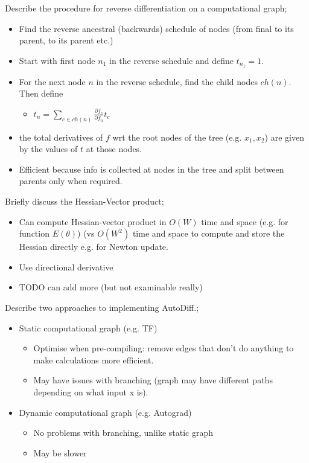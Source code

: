 \documentclass{article}
\begin{document}
Describe the procedure for reverse differentiation on a computational graph; \begin{itemize} \item Find the reverse ancestral (backwards) schedule of nodes (from final to its parent, to its parent etc.) \item Start with first node $n_1$ in the reverse schedule and define $t_{n_1}=1$.  \item For the next node $n$ in the reverse schedule, find the child nodes $ch(n)$. Then define \begin{itemize} \item $t_n = \sum_{c\in ch(n)}\frac{\partial f_c}{\partial f_n}t_c$ \end{itemize} \item the total derivatives of $f$ wrt the root nodes of the tree (e.g. $x_1, x_2$) are given by the values of $t$ at those nodes.  \item Efficient because info is collected at nodes in the tree and split between parents only when required.  \end{itemize}

Briefly discuss the Hessian-Vector product; \begin{itemize} \item Can compute Hessian-vector product in $O(W)$ time and space (e.g. for function $E(\theta)$) (vs $O(W^2)$ time and space to compute and store the Hessian directly e.g. for Newton update.  \item Use directional derivative \item TODO can add more (but not examinable really) \end{itemize}

Describe two approaches to implementing AutoDiff.; \begin{itemize} \item Static computational graph (e.g. TF) \begin{itemize} \item Optimise when pre-compiling: remove edges that don't do anything to make calculations more efficient.  \item May have issues with branching (graph may have different paths depending on what input x is).  \end{itemize} \item Dynamic computational graph (e.g. Autograd) \begin{itemize} \item No problems with branching, unlike static graph \item May be slower \end{itemize} \end{itemize} 
\end{document}
